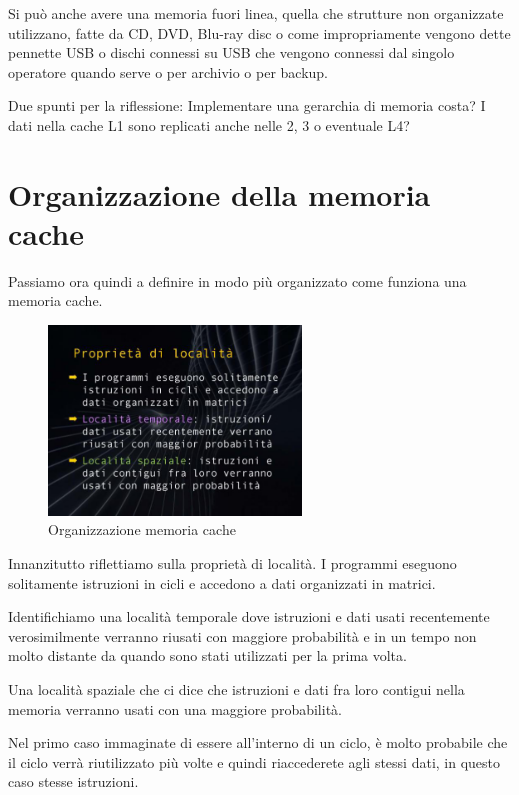 Si può anche avere una memoria fuori linea, quella che strutture non organizzate utilizzano, fatte da CD, DVD, Blu-ray disc o come impropriamente vengono dette pennette USB o dischi connessi su USB che vengono connessi dal singolo operatore quando serve o per archivio o per backup.

Due spunti per la riflessione: Implementare una gerarchia di memoria costa? I dati nella cache L1 sono replicati anche nelle 2, 3 o eventuale L4?

\section{Organizzazione della memoria cache}

Passiamo ora quindi a definire in modo più organizzato come funziona una memoria cache.

\FloatBarrier
\begin{figure}[H]
  \centering
  \includegraphics[width=0.60\textwidth,
                    trim=20 55 10 45, %
                    clip]
                    {images/Lez06_p03_fig_03.png}
  \caption{Organizzazione memoria cache}
  \label{fig:Lez06_p02_fig_05}
\end{figure}
\FloatBarrier
\noindent


Innanzitutto riflettiamo sulla proprietà di località.
I programmi eseguono solitamente istruzioni in cicli e accedono a dati organizzati in matrici.

Identifichiamo una località temporale dove istruzioni e dati usati recentemente verosimilmente verranno riusati con maggiore probabilità e in un tempo non molto distante da quando sono stati utilizzati per la prima volta.

Una località spaziale che ci dice che istruzioni e dati fra loro contigui nella memoria verranno usati con una maggiore probabilità.

Nel primo caso immaginate di essere all'interno di un ciclo, è molto probabile che il ciclo verrà riutilizzato più volte e quindi riaccederete agli stessi dati, in questo caso stesse istruzioni.

